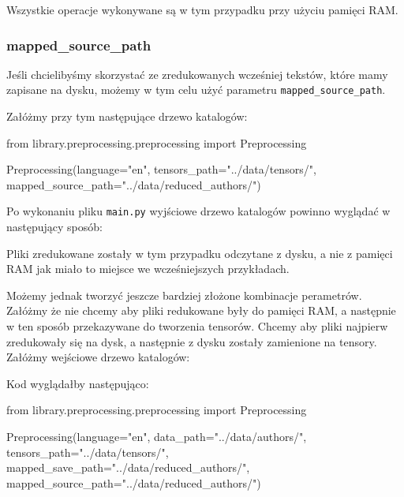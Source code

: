 Wszystkie operacje wykonywane są w tym przypadku przy użyciu pamięci RAM.

\newpage
\subsubsection{mapped\_source\_path}
Jeśli chcielibyśmy skorzystać ze zredukowanych wcześniej tekstów, które mamy zapisane na dysku, 
możemy w tym celu użyć parametru \texttt{mapped\_source\_path}.

Załóżmy przy tym następujące drzewo katalogów:
\myspace
{}
\myspace

\begin{python}
from library.preprocessing.preprocessing import Preprocessing

Preprocessing(language="en",
              tensors_path="../data/tensors/",
              mapped_source_path="../data/reduced_authors/")
                   
\end{python}

Po wykonaniu pliku \texttt{main.py} wyjściowe drzewo katalogów powinno wyglądać w następujący sposób:
\myspace
{}
\myspace

Pliki zredukowane zostały w tym przypadku odczytane z dysku, a nie z pamięci RAM jak miało to miejsce
we wcześniejszych przykładach. 
\newline

Możemy jednak tworzyć jeszcze bardziej złożone kombinacje perametrów. Załóżmy że nie chcemy aby pliki redukowane były
do pamięci RAM, a następnie w ten sposób przekazywane do tworzenia tensorów. Chcemy aby pliki najpierw
zredukowały się na dysk, a następnie z dysku zostały zamienione na tensory. 
Załóżmy wejściowe drzewo katalogów:

\myspace
{}
\myspace

Kod wyglądałby następująco:
\begin{python}
from library.preprocessing.preprocessing import Preprocessing

Preprocessing(language="en",
              data_path="../data/authors/",
              tensors_path="../data/tensors/",
              mapped_save_path="../data/reduced_authors/",
              mapped_source_path="../data/reduced_authors/")

\end{python}

